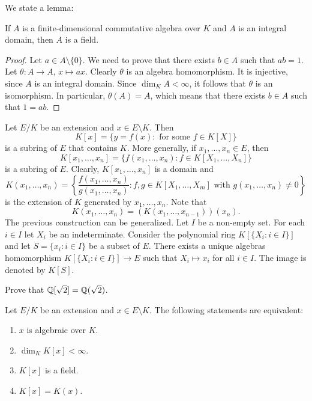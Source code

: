 We state a lemma:

\begin{lemma}
If $A$ is a finite-dimensional commutative algebra over $K$ 
and $A$ is an integral domain, then $A$ is a field. 
\end{lemma}

\begin{proof}
	Let $a\in A\setminus\{0\}$. We need to prove that there exists $b\in A$
	such that $ab=1$. Let $\theta\colon A\to A$, $x\mapsto ax$. Clearly
	$\theta$ is an algebra homomorphism. It is injective, since $A$ is an
	integral domain.  Since $\dim_KA<\infty$, it follows that $\theta$ is an
	isomorphism. In particular, $\theta(A)=A$, which means that there exists
	$b\in A$ such that $1=ab$. 
\end{proof}

Let $E/K$ be an extension and $x\in E\setminus K$. 
Then 
\[
K[x]=\{y=f(x):\text{ for some $f\in K[X]$}\}
\]
is a subring of $E$ that contains $K$. More generally,
if $x_1,\dots,x_n\in E$, then
\[
K[x_1,\dots,x_n]=\{f(x_1,\dots,x_n):f\in K[X_1,\dots,X_n]\}
\]
is a subring of $E$. Clearly, $K[x_1,\dots,x_n]$ is a domain
and 
\[
K(x_1,\dots,x_n)=\left\{\frac{f(x_1,\dots,x_n)}{g(x_1,\dots,x_n)}:f,g\in K[X_1,\dots,X_m]\text{ with $g(x_1,\dots,x_n)\ne 0$}\right\}
\]
is the extension of $K$ generated by $x_1,\dots,x_n$. 
Note that 
\[
K(x_1,\dots,x_n)=(K(x_1,\dots,x_{n-1}))(x_n).
\]
The previous construction
can be generalized. Let $I$ be a non-empty set. 
For each $i\in I$ let $X_i$ be an indeterminate. Consider
the polynomial ring $K[\{X_i:i\in I\}]$ and let 
$S=\{x_i:i\in I\}$ be a subset of $E$. There exists a unique 
algebras homomorphism $K[\{X_i:i\in I\}]\to E$ 
such that $X_i\mapsto x_i$ for all $i\in I$. The image 
is denoted by $K[S]$. 

\begin{exercise}
    Prove that $\mathbb{Q}[\sqrt{2}]=\mathbb{Q}(\sqrt{2})$. 
\end{exercise}

\begin{theorem}
	Let $E/K$ be an extension and $x\in E\setminus K$.
	The following statements are equivalent:
	\begin{enumerate}
		\item $x$ is algebraic over $K$.
		\item $\dim_KK[x]<\infty$.
		\item $K[x]$ is a field.
		\item $K[x]=K(x)$. 
	\end{enumerate}
\end{theorem}

